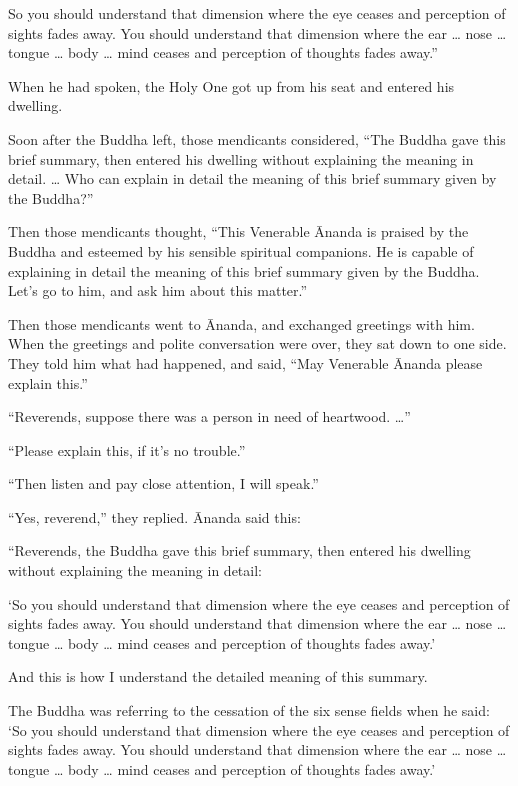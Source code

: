 \documentclass[12pt,openany]{book}%
\begin{document}
So you should understand that dimension where the eye ceases and perception of sights fades away. You should understand that dimension where the ear … nose … tongue … body … mind ceases and perception of thoughts fades away.” 

When he had spoken, the Holy One got up from his seat and entered his dwelling. 

Soon after the Buddha left, those mendicants considered, “The Buddha gave this brief summary, then entered his dwelling without explaining the meaning in detail. … Who can explain in detail the meaning of this brief summary given by the Buddha?” 

Then those mendicants thought, “This Venerable Ānanda is praised by the Buddha and esteemed by his sensible spiritual companions. He is capable of explaining in detail the meaning of this brief summary given by the Buddha. Let’s go to him, and ask him about this matter.” 

Then those mendicants went to Ānanda, and exchanged greetings with him. When the greetings and polite conversation were over, they sat down to one side. They told him what had happened, and said, “May Venerable Ānanda please explain this.” 

“Reverends, suppose there was a person in need of heartwood. …” 

“Please explain this, if it’s no trouble.” 

“Then listen and pay close attention, I will speak.” 

“Yes, reverend,” they replied. Ānanda said this: 

“Reverends, the Buddha gave this brief summary, then entered his dwelling without explaining the meaning in detail: 

‘So you should understand that dimension where the eye ceases and perception of sights fades away. You should understand that dimension where the ear … nose … tongue … body … mind ceases and perception of thoughts fades away.’ 

And this is how I understand the detailed meaning of this summary. 

The Buddha was referring to the cessation of the six sense fields when he said: ‘So you should understand that dimension where the eye ceases and perception of sights fades away. You should understand that dimension where the ear … nose … tongue … body … mind ceases and perception of thoughts fades away.’ 
\end{document}
